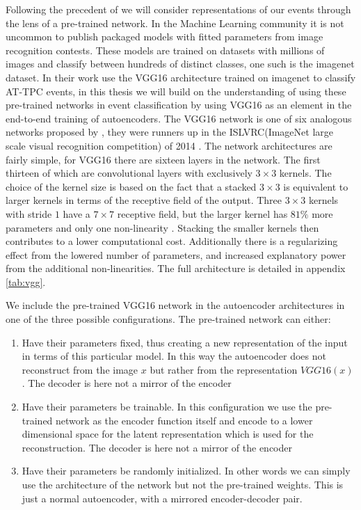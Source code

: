 Following the precedent of \citet{Kuchera2019} we will consider representations of our events through the lens of a pre-trained network. In the Machine Learning community it is not uncommon to publish packaged models with fitted parameters from image recognition contests. These models are trained on datasets with millions of images and classify between hundreds of distinct classes, one such is the imagenet dataset. In their work \citet{Kuchera2019} use the VGG16 architecture trained on imagenet to classify AT-TPC events, in this thesis we will build on the understanding of using these pre-trained networks in event classification by using VGG16 as an element in the end-to-end training of autoencoders. The VGG16 network is  one of six analogous networks proposed by \citet{Simonyan2014}, they were runners up in the ISLVRC(ImageNet large scale visual recognition competition) of 2014 \cite{Russakovsky2015}. The network architectures are fairly simple, for VGG16 there are sixteen layers in the network. The first thirteen of which are convolutional layers with exclusively $3 \times 3$ kernels. The choice of the kernel size  is based on the fact that a stacked $3 \times 3$ is equivalent to larger kernels in terms of the receptive field of the output. Three $3 \times 3$ kernels with stride $1$ have a $7 \times 7$ receptive field, but the larger kernel has $81\%$ more parameters and only one non-linearity \cite{Simonyan2014}. Stacking the smaller kernels then contributes to a lower computational cost. Additionally there is a regularizing effect from the lowered number of parameters, and increased explanatory power from the additional non-linearities. The full architecture is detailed in appendix \ref{tab:vgg}.

We include the pre-trained VGG16 network in the autoencoder architectures in one of the three possible configurations. The pre-trained network can either:

\begin{enumerate}
\item Have their parameters fixed, thus creating a new representation of the input in terms of this particular model. In this way the autoencoder does not reconstruct from the image $x$ but rather from the representation $VGG16(x)$. The decoder is here not a mirror of the encoder
\item Have their parameters be trainable. In this configuration we use the pre-trained network as the encoder function itself and encode to a lower dimensional space for the latent representation which is used for the reconstruction. The decoder is here not a mirror  of the encoder
\item Have their parameters be randomly initialized. In other words we can simply use the architecture of  the network but not the pre-trained weights. This is just a normal autoencoder, with a mirrored encoder-decoder pair. 
\end{enumerate}

